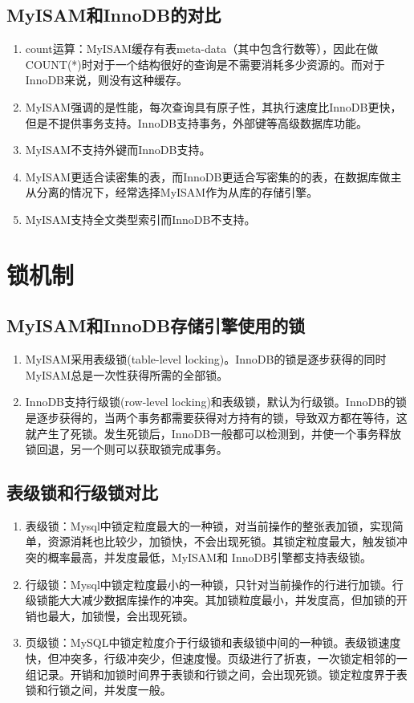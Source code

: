 \documentclass[main.tex]{subfiles}
\begin{document}
\subsection{MyISAM和InnoDB的对比}
\begin{enumerate}
    \item count运算：MyISAM缓存有表meta-data（其中包含行数等），因此在做COUNT(*)时对于一个结构很好的查询是不需要消耗多少资源的。而对于InnoDB来说，则没有这种缓存。
    \item MyISAM强调的是性能，每次查询具有原子性，其执行速度比InnoDB更快，但是不提供事务支持。InnoDB支持事务，外部键等高级数据库功能。
    \item MyISAM不支持外键而InnoDB支持。
    \item MyISAM更适合读密集的表，而InnoDB更适合写密集的的表，在数据库做主从分离的情况下，经常选择MyISAM作为从库的存储引擎。
    \item MyISAM支持全文类型索引而InnoDB不支持。
\end{enumerate}

\section{锁机制}
\subsection{MyISAM和InnoDB存储引擎使用的锁}
\begin{enumerate}
    \item MyISAM采用表级锁(table-level locking)。InnoDB的锁是逐步获得的同时MyISAM总是一次性获得所需的全部锁。
    \item InnoDB支持行级锁(row-level locking)和表级锁，默认为行级锁。InnoDB的锁是逐步获得的，当两个事务都需要获得对方持有的锁，导致双方都在等待，这就产生了死锁。发生死锁后，InnoDB一般都可以检测到，并使一个事务释放锁回退，另一个则可以获取锁完成事务。
\end{enumerate}

\subsection{表级锁和行级锁对比}
\begin{enumerate}
    \item 表级锁：Mysql中锁定粒度最大的一种锁，对当前操作的整张表加锁，实现简单，资源消耗也比较少，加锁快，不会出现死锁。其锁定粒度最大，触发锁冲突的概率最高，并发度最低，MyISAM和 InnoDB引擎都支持表级锁。
    \item 行级锁：Mysql中锁定粒度最小的一种锁，只针对当前操作的行进行加锁。行级锁能大大减少数据库操作的冲突。其加锁粒度最小，并发度高，但加锁的开销也最大，加锁慢，会出现死锁。
    \item 页级锁：MySQL中锁定粒度介于行级锁和表级锁中间的一种锁。表级锁速度快，但冲突多，行级冲突少，但速度慢。页级进行了折衷，一次锁定相邻的一组记录。开销和加锁时间界于表锁和行锁之间，会出现死锁。锁定粒度界于表锁和行锁之间，并发度一般。
\end{enumerate}
\end{document}
